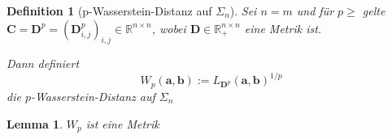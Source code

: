 \documentclass[11pt,a4paper]{article}
\newtheorem{lemma}[theorem]{Lemma}
\newtheorem{definition}[theorem]{Definition}
\numberwithin{equation}{section}
\begin{document}
	\begin{definition}[p-Wasserstein-Distanz auf $\Sigma_n$]
		Sei $n=m$ und für $p \geq$ gelte $\boldsymbol{C} = \boldsymbol{D}^p = (\boldsymbol{D}_{i,j}^p)_{i,j} \in \mathbb{R}^{n \times n}$, wobei $\boldsymbol{D} \in \mathbb{R}_+^{n \times n}$ eine Metrik ist.
		
		Dann definiert 
		\begin{equation}
		W_p(\boldsymbol{a}, \boldsymbol{b}) := L_{\boldsymbol{D}^p} (\boldsymbol{a}, \boldsymbol{b})^{1/p}
		\end{equation} 
		die $p$-Wasserstein-Distanz auf $\Sigma_n$
	\end{definition}
	
	\begin{lemma}
		$W_p$ ist eine Metrik
	\end{lemma}
	
\end{document}
